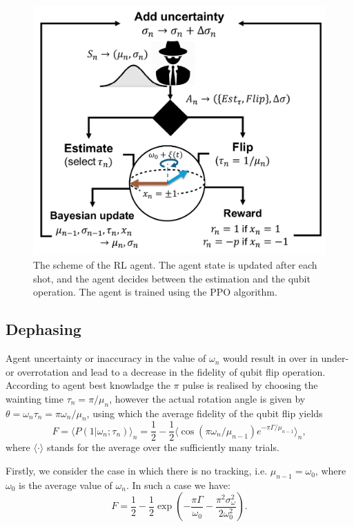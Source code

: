 \documentclass[aps,twocolumn,pra,notitlepage,]{revtex4-2}
\begin{document}
\begin{figure}
    \centering
    \includegraphics[width=\columnwidth]{scheme_RL.pdf}
    \caption{The scheme of the RL agent. The agent state is updated after each shot, and the agent decides between the estimation and the qubit operation. The agent is trained using the PPO algorithm.}
\end{figure}


\subsection{Dephasing}
Agent uncertainty or inaccuracy in the value of $\omega_n$ would result in over in under- or overrotation and lead to a decrease in the fidelity of qubit flip operation. According to agent best knowladge the $\pi$ pulse is realised by choosing the wainting time $\tau_n = \pi/\mu_n$, however the actual rotation angle is given by $\theta = \omega_n \tau_n = \pi \omega_n/\mu_n$, using which the average fidelity of the qubit flip yields
\begin{equation}
 F  = \langle P(1|\omega_n;\tau_n) \rangle_n = \frac{1}{2} - \frac{1}{2}\big\langle \cos(\pi \omega_n/\mu_{n-1})e^{-\pi\Gamma/\mu_{n-1}} \big\rangle_n,
\end{equation}
where $\langle \cdot \rangle$ stands for the average over the sufficiently many trials. 


Firstly, we consider the case in which there is no tracking, i.e. $\mu_{n-1} = \omega_0$, where $\omega_0$ is the average value of $\omega_n$. In such a case we have:
\begin{equation}
    F = \frac{1}{2} - \frac{1}{2} \exp\left(-\frac{\pi\Gamma}{\omega_0} - \frac{\pi^2 \sigma_\omega^2}{2\omega_0^2}\right).
\end{equation}
\end{document}
